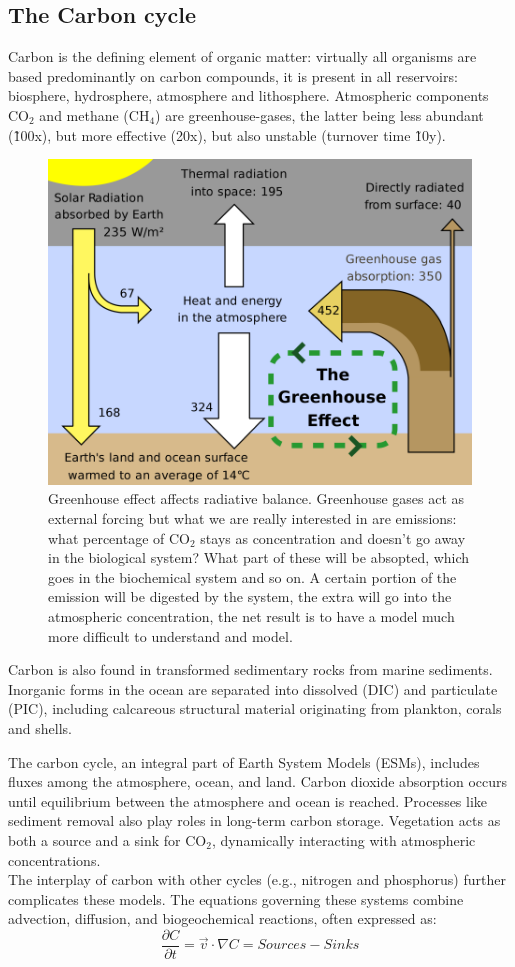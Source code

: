 \subsection{The Carbon cycle}
Carbon is the defining element of organic matter: virtually all organisms are based predominantly on carbon compounds, it is present in all reservoirs: biosphere, hydrosphere, atmosphere and lithosphere. Atmospheric components CO$_2$ and methane (CH$_4$) are greenhouse-gases, the latter being less abundant (\~100x), but more effective (20x), but also unstable (turnover time \~10y).
\begin{figure}[htpb]
	\centering
	\includegraphics[width=0.4\linewidth]{uploads/greenhouse situa.png}
	\caption{Greenhouse effect affects radiative balance. Greenhouse gases act as external forcing but what we are really interested in are emissions: what percentage of CO$_2$ stays as concentration and doesn't go away in the biological system? What part of these will be absopted, which goes in the biochemical system and so on.
		A certain portion of the emission will be digested by the system, the extra will go into the atmospheric concentration, the net result is to have a model much more difficult to understand and model.}

\end{figure}
Carbon is also found in transformed sedimentary rocks from marine sediments. Inorganic forms in the ocean are separated into dissolved (DIC) and particulate (PIC), including calcareous structural material originating from plankton, corals and shells.

The carbon cycle, an integral part of Earth System Models (ESMs), includes fluxes among the atmosphere, ocean, and land. Carbon dioxide absorption occurs until equilibrium between the atmosphere and ocean is reached. Processes like sediment removal also play roles in long-term carbon storage. Vegetation acts as both a source and a sink for CO$_2$, dynamically interacting with atmospheric concentrations.\\



The interplay of carbon with other cycles (e.g., nitrogen and phosphorus) further complicates these models. The equations governing these systems combine advection, diffusion, and biogeochemical reactions, often expressed as:
$$\frac{\partial C}{\partial t}=\vec{v}\cdot \nabla C=Sources-Sinks$$

